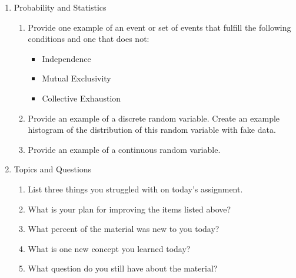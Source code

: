 \documentclass[12pt,thmsa]{article}
\begin{document}
\begin{enumerate}
\item Probability and Statistics 
  \begin{enumerate}
    \item Provide one example of an event or set of events that fulfill the following conditions and one that does not: 
      \begin{itemize}
        \item Independence
        \item Mutual Exclusivity 
        \item Collective Exhaustion
      \end{itemize}
    \item Provide an example of a discrete random variable. Create an example histogram of the distribution of this random variable with fake data. 
    \item Provide an example of a continuous random variable. 
  \end{enumerate}
\item Topics and Questions
    \begin{enumerate}
        \item List three things you struggled with on today's assignment. 
        \item What is your plan for improving the items listed above?
        \item What percent of the material was new to you today?
        \item What is one new concept you learned today?
        \item What question do you still have about the material?
    \end{enumerate}

\end{enumerate}
\end{document}
